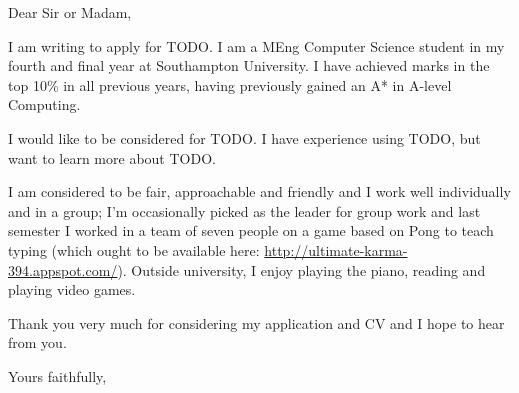 \documentclass[a4paper, margin=0.3in]{letter}
\begin{document}
\begin{letter}{}

\opening{Dear Sir or Madam,}

I am writing to apply for TODO. I am a MEng Computer Science student in my
fourth and final year at Southampton University. I have achieved marks in the
top 10\% in all previous years, having previously gained an A* in A-level
Computing.

I would like to be considered for TODO. I have experience using TODO, but
want to learn more about TODO.

I am considered to be fair, approachable and friendly and I work well
individually and in a group; I'm occasionally picked as the leader for group
work and last semester I worked in a team of seven people on a game based on
Pong to teach typing (which ought to be available here:
\url{http://ultimate-karma-394.appspot.com/}). Outside university, I enjoy
playing the piano, reading and playing video games.

Thank you very much for considering my application and CV and I hope to hear
from you.

\closing{Yours faithfully,}

\end{letter}
\end{document}
